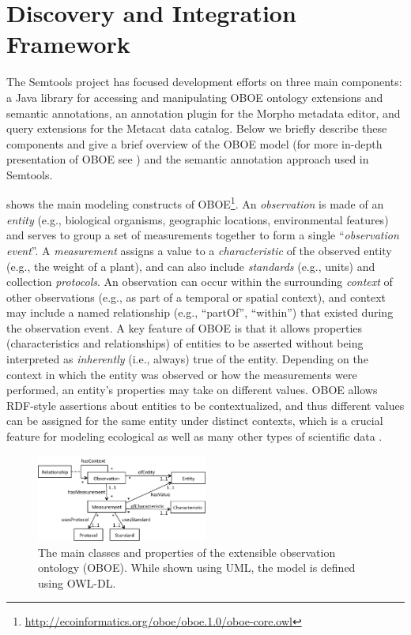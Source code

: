\section{Discovery and Integration Framework}
\label{sec:framework}

The Semtools project has focused development efforts on three main
components: a Java library for accessing and manipulating OBOE
ontology extensions and semantic annotations, an annotation plugin for
the Morpho metadata editor, and query extensions for the Metacat data
catalog. Below we briefly describe these components and give a brief
overview of the OBOE model (for more in-depth presentation of OBOE see
\cite{madin07:_ontol_for_descr_and_synth,bowers08}) and the semantic
annotation approach used in Semtools.


   shows the
main modeling constructs of
OBOE\footnote{\url{http://ecoinformatics.org/oboe/oboe.1.0/oboe-core.owl}}. An
{\em observation} is made of an {\em entity} (e.g., biological
organisms, geographic locations, environmental features) and serves to
group a set of measurements together to form a single
``\emph{observation event}''. A \emph{measurement} assigns a value to
a {\em characteristic} of the observed entity (e.g., the weight of a
plant), and can also include \emph{standards} (e.g., units) and
collection \emph{protocols}. An observation can occur within the
surrounding \emph{context} of other observations (e.g., as part of a
temporal or spatial context), and context may include a named
relationship (e.g., ``partOf'', ``within'') that existed during the
observation event. A key feature of OBOE is that it allows properties
(characteristics and relationships) of entities to be asserted without
being interpreted as \emph{inherently} (i.e., {always}) true of the
entity.  Depending on the context in which the entity was observed or
how the measurements were performed, an entity's properties may take
on different values.  OBOE allows RDF-style assertions about entities
to be contextualized, and thus different values can be assigned for
the same entity under distinct contexts, which is a crucial feature
for modeling ecological as well as many other types of scientific data
\cite{bowers08,mungall07:_repres_phenot_in_owl}.

\begin{figure}
  \centering
  \includegraphics[width=0.5\textwidth]{images/oboe}
  \caption{The main classes and properties of the extensible
    observation ontology (OBOE). While shown using UML, the model is
    defined using OWL-DL.}
  \label{fig:oboe}
\end{figure}

